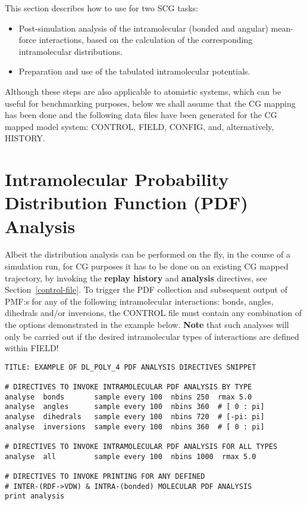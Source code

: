 This section describes how to use \D for two SCG tasks:

\begin{itemize}
\item Post-simulation analysis of the intramolecular (bonded and angular)
mean-force interactions, based on the calculation of the corresponding
intramolecular distributions.
\item Preparation and use of the tabulated intramolecular potentials.
\end{itemize}

 Although these steps are also applicable to
atomistic systems, which can be useful for benchmarking purposes,
below we shall assume that the CG mapping has been done and the following
data files have been generated for the CG mapped model system:
CONTROL, FIELD, CONFIG, and, alternatively, HISTORY.

\section{Intramolecular Probability Distribution Function (PDF) Analysis}
\label{IPDF-analysis}

Albeit the distribution analysis can be performed on the fly,
in the course of a simulation run, for CG purposes it has
to be done on an existing CG mapped trajectory, by invoking
the {\bf replay history} and {\bf analysis} directives,
see Section~\ref{control-file}.
To trigger the PDF collection and subsequent output of PMF:s
for any of the following intramolecular interactions: bonds,
angles, dihedrals and/or inversions, the CONTROL file must
contain any combination of the options demonstrated
in the example below.  {\bf Note} that such analyses will
only be carried out if the desired intramolecular types of
interactions are defined within FIELD!

\begin{lstlisting}
TITLE: EXAMPLE OF DL_POLY_4 PDF ANALYSIS DIRECTIVES SNIPPET

# DIRECTIVES TO INVOKE INTRAMOLECULAR PDF ANALYSIS BY TYPE
analyse  bonds       sample every 100  nbins 250  rmax 5.0
analyse  angles      sample every 100  nbins 360  # [ 0 : pi]
analyse  dihedrals   sample every 100  nbins 720  # [-pi: pi]
analyse  inversions  sample every 100  nbins 360  # [ 0 : pi]

# DIRECTIVES TO INVOKE INTRAMOLECULAR PDF ANALYSIS FOR ALL TYPES
analyse  all         sample every 100  nbins 1000  rmax 5.0

# DIRECTIVES TO INVOKE PRINTING FOR ANY DEFINED
# INTER-(RDF->VDW) & INTRA-(bonded) MOLECULAR PDF ANALYSIS
print analysis
\end{lstlisting}

